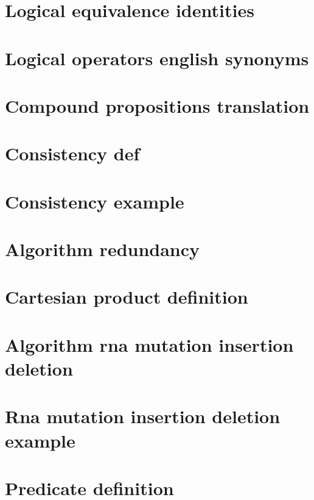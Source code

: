 \section*{Logical equivalence identities}

\vfill
\section*{Logical operators english synonyms}

\vfill
\section*{Compound propositions translation}

\vfill
\section*{Consistency def}

\vfill
\section*{Consistency example}

\vfill
\section*{Algorithm redundancy}

\vfill
\section*{Cartesian product definition}

\vfill
\section*{Algorithm rna mutation insertion deletion}

\vfill
\section*{Rna mutation insertion deletion example}

\vfill
\section*{Predicate definition}

\vfill
